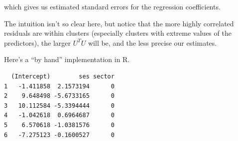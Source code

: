\documentclass[
  letterpaper,
  DIV=11,
  numbers=noendperiod]{scrreprt}
\newenvironment{Shaded}{\begin{snugshade}}{\end{snugshade}}
\newcommand{\DocumentationTok}[1]{\textcolor[rgb]{0.73,0.13,0.13}{\textit{#1}}}
\newcommand{\FunctionTok}[1]{\textcolor[rgb]{0.02,0.16,0.49}{#1}}
\newcommand{\NormalTok}[1]{\textcolor[rgb]{0.00,0.44,0.13}{#1}}
\newcommand{\OtherTok}[1]{\textcolor[rgb]{0.00,0.44,0.13}{#1}}
\newcommand{\SpecialCharTok}[1]{\textcolor[rgb]{0.25,0.44,0.63}{#1}}
\begin{document}
which gives us estimated standard errors for the regression
coefficients.

The intuition isn't so clear here, but notice that the more highly
correlated residuals are within clusters (especially clusters with
extreme values of the predictors), the larger \(U^TU\) will be, and the
less precise our estimates.

Here's a ``by hand'' implementation in R.

\begin{Shaded}
\end{Shaded}

\begin{verbatim}
  (Intercept)        ses sector
1   -1.411858  2.1573194      0
2    9.648498 -5.6733165      0
3   10.112584 -5.3394444      0
4   -1.042618  0.6964687      0
5    6.570618 -1.0381576      0
6   -7.275123 -0.1600527      0
\end{verbatim}
\end{document}
